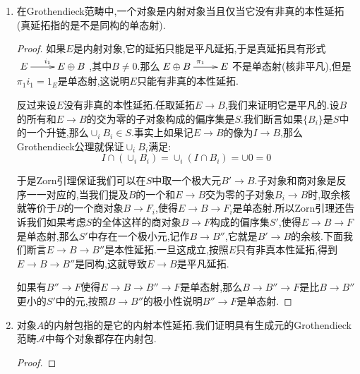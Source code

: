 \begin{enumerate}
\begin{proof}
    	取$S=\sum_JE_j$,记$l_j:E_j\to S$是余核泛性质中的态射,对每个$j\in J$,定义$h_j:S\to S$是如下态射诱导的:
    	$$\xymatrix{E_k\ar[r]^{l_k}&S\ar[r]^{h_j}&S}=\left\{\begin{array}{cc}\xymatrix{E_k\ar[r]&E_j\ar[r]^{l_j}&S}&k\le j\\\xymatrix{E_k\ar[r]^{l_k}&S}&j\ge k\end{array}\right.$$
    	
    	对$k\le k'$有$h_{k'}=\xymatrix{S\ar[r]^{h_k}&S\ar[r]^{h_{k'}}&S}$,于是$\{\ker(h_k)\}$是子对象的一个升链,于是$\cup_j\ker(h_k)$存在,它的余核记作$h:S\to E$.我们断言每个$\xymatrix{E_j\ar[r]^{l_j}&S\ar[r]^h&S}$是单态射.为此只需验证$\mathrm{im}(E_j\to S)\cap\left(\cup_j\ker(h_k)\right)=0$,这按照Grothendieck公理是成立的.
    \end{proof}
    \item 在Grothendieck范畴中,一个对象是内射对象当且仅当它没有非真的本性延拓(真延拓指的是不是同构的单态射).
    \begin{proof}
    	
    	如果$E$是内射对象,它的延拓只能是平凡延拓,于是真延拓具有形式$\xymatrix{E\ar[r]^{i_1}&E\oplus B}$,其中$B\not=0$.那么$\xymatrix{E\oplus B\ar[r]^{\pi_1}&E}$不是单态射(核非平凡),但是$\pi_1i_1=1_E$是单态射,这说明$E$只能有非真的本性延拓.
    	
    	\qquad
    	
    	反过来设$E$没有非真的本性延拓.任取延拓$E\to B$,我们来证明它是平凡的.设$B$的所有和$E\to B$的交为零的子对象构成的偏序集是$S$.我们断言如果$\{B_i\}$是$S$中的一个升链,那么$\cup_iB_i\in S$.事实上如果记$E\to B$的像为$I\to B$,那么Grothendieck公理就保证$\cup_iB_i$满足:
    	$$I\cap\left(\cup_iB_i\right)=\cup_i(I\cap B_i)=\cup 0=0$$
    	
    	于是Zorn引理保证我们可以在$S$中取一个极大元$B'\to B$.子对象和商对象是反序一一对应的,当我们提及$B$的一个和$E\to B$交为零的子对象$B_i\to B$时,取余核就等价于$B$的一个商对象$B\to F_i$,使得$E\to B\to F_i$是单态射.所以Zorn引理还告诉我们如果考虑$S$的全体这样的商对象$B\to F$构成的偏序集$S'$,使得$E\to B\to F$是单态射,那么$S'$中存在一个极小元,记作$B\to B''$,它就是$B'\to B$的余核.下面我们断言$E\to B\to B''$是本性延拓.一旦这成立,按照$E$只有非真本性延拓,得到$E\to B\to B''$是同构,这就导致$E\to B$是平凡延拓.
    	
    	\qquad
    	
    	如果有$B''\to F$使得$E\to B\to B''\to F$是单态射,那么$B\to B''\to F$是比$B\to B''$更小的$S'$中的元,按照$B\to B''$的极小性说明$B''\to F$是单态射.
    \end{proof}
    \item 对象$A$的内射包指的是它的内射本性延拓.我们证明具有生成元的Grothendieck范畴$\mathscr{A}$中每个对象都存在内射包.
    \begin{proof}
    	

\end{proof}
\end{enumerate}
